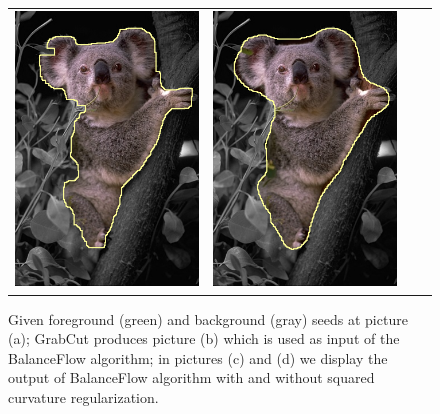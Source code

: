 \begin{figure}
\begin{tabular}{cccc}
 	\includegraphics[scale=0.25]{figures/chapter7/segmentation/coala/k-0.0/corrected-seg.png} &  	
 	\includegraphics[scale=0.25]{figures/chapter7/segmentation/coala/k-1.0/corrected-seg.png}
\end{tabular}	
\caption{ Given foreground (green) and background (gray) seeds at picture (a); GrabCut produces picture (b) which is used as input of the BalanceFlow algorithm; in pictures (c) and (d) we display the output of BalanceFlow algorithm with and without squared curvature regularization. }
\label{ch7:fig:ch7-segmentation}
\end{figure}


